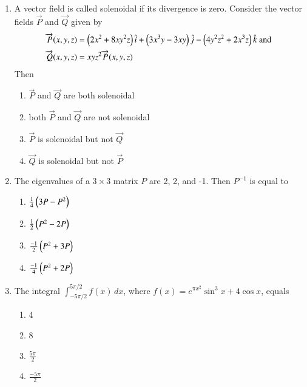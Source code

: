 \documentclass[journal,9pt,onecolumn]{IEEEtran}
\begin{document}
\begin{enumerate}
\item A vector field is called solenoidal if its divergence is zero. Consider the vector fields $\overrightarrow{P}$ and $\overrightarrow{Q}$ given by
$$
\begin{aligned}
    & \overrightarrow{P}(x, y, z)=\left(2 x^2+8 x y^2 z\right) \hat{i}+\left(3 x^3 y-3 x y\right) \hat{j}-\left(4 y^2 z^2+2 x^3 z\right) \hat{k} \text { and } \\
    & \overrightarrow{Q}(x, y, z)=x y z^2 \overrightarrow{P}(x, y, z)
\end{aligned}
$$
Then
\begin{multicols}{2}
\begin{enumerate}
    \item $\overrightarrow{P}$ and $\overrightarrow{Q}$ are both solenoidal
    \item both $\overrightarrow{P}$ and $\overrightarrow{Q}$ are not solenoidal
    \item $\overrightarrow{P}$ is solenoidal but not $\overrightarrow{Q}$
    \item $\overrightarrow{Q}$ is solenoidal but not $\overrightarrow{P}$
\end{enumerate}
\end{multicols}

\item The eigenvalues of a $3 \times 3$ matrix $P$ are 2, 2, and -1. Then $P^{-1}$ is equal to
\begin{multicols}{4}
\begin{enumerate}
    \item $\frac{1}{4}\left(3 P - P^2\right)$
    \item $\frac{1}{2}\left(P^2 - 2 P\right)$
    \item $\frac{-1}{2}\left(P^2 + 3 P\right)$
    \item $\frac{-1}{4}\left(P^2 + 2 P\right)$
\end{enumerate}
\end{multicols}

\item The integral $\int_{-5 \pi / 2}^{5 \pi / 2} f(x) \, dx$, where $f(x)=e^{\pi x^2} \sin^3 x + 4 \cos x$, equals
\begin{multicols}{4}
\begin{enumerate}
    \item 4
    \item 8
    \item $\frac{5 \pi}{2}$
    \item $\frac{-5 \pi}{2}$
\end{enumerate}
\end{multicols}
\end{enumerate}
\end{document}
